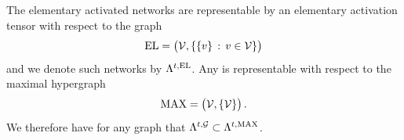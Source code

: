 The elementary activated networks are representable by an elementary activation tensor with respect to the graph
\begin{align*}
    \mathrm{EL} = \big(\mathcal{V},\{\{v\}\,:\,v\in\mathcal{V}\}\big)
\end{align*}
and we denote such networks by $\Lambda^{t,\mathrm{EL}}$.
Any \CompActNet{} is representable with respect to the maximal hypergraph
\begin{align*}
    \mathrm{MAX}  = \big(\mathcal{V},\{\mathcal{V}\}\big) \, .
\end{align*}
We therefore have for any graph that $\Lambda^{t,\mathcal{G}}\subset\Lambda^{t,\mathrm{MAX}}$.

